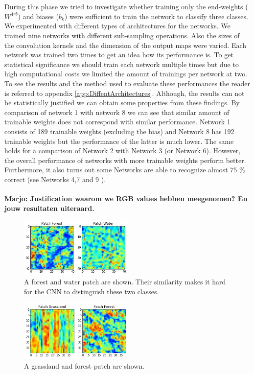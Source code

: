 \documentclass[a4paper,onecolumn]{report}
\begin{document}
\\\\
During this phase we tried to investigate whether training only the end-weights ($W^{4rb}$) and biases ($b_{k}$) were sufficient to train the network to classify three classes. We experimented with different types of architectures for the networks. We trained nine networks with different sub-sampling operations. Also the sizes of the convolution kernels and the dimension of the output maps were varied. Each network was trained two times to get an idea how its performance is. To get statistical significance we should train each network multiple times but due to high computational costs we limited the amount of trainings per network at two. To see the results and the method used to evaluate these performances the reader is referred to appendix \ref{app:DiffentArchitectures}. Although, the results can not be statistically justified we can obtain some properties from these findings. By comparison of network 1 with network 8 we can see that similar amount of trainable weights does not correspond with similar performance. Network 1 consists of 189 trainable weights (excluding the bias) and Network 8 has 192  trainable weights but the performance of the latter is much lower. The same holds for a comparison of Network 2 with Network 3 (or Network 6). However, the overall performance of networks with more trainable weights perform better. Furthermore, it also turns out some Networks are able to recognize almost $75$ \% correct (see Networks 4,7 and 9 ). 
\\\\
\textbf{Marjo: Justification waarom we RGB values hebben meegenomen? En jouw resultaten uiteraard. }
\begin{figure}[bth]
	\centering
	\includegraphics[width=0.5\textwidth]{./images/WaterForestPatch.jpg}
	\caption{A forest and water patch are shown. Their similarity makes it hard for the CNN to distinguish these two classes.}
	\label{fig:WaterForestPatch}
\end{figure}
\begin{figure}[bth!]
	\centering
	\includegraphics[width=0.5\textwidth]{./images/GrassForestPatch.jpg}
	\caption{A grassland and forest patch are shown.}
	\label{fig:GrassForestPatch}
\end{figure}
\\\\
\end{document}
